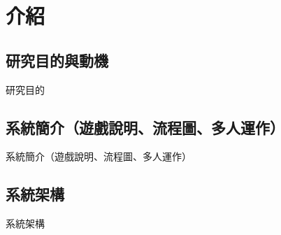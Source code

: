 \chapter{介紹}
\section{研究目的與動機}

    研究目的

\section{系統簡介（遊戲說明、流程圖、多人運作）}

    系統簡介（遊戲說明、流程圖、多人運作）

\section{系統架構}

    系統架構
